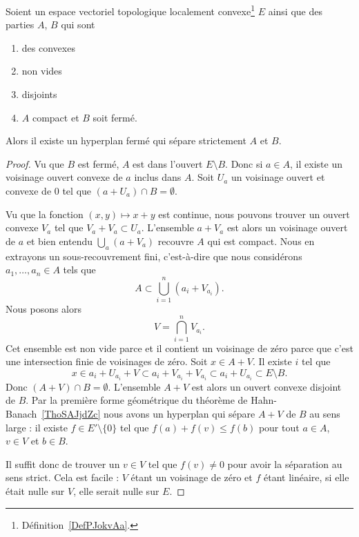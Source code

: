 \begin{theorem} \label{ThoACuKgtW}
    Soient un espace vectoriel topologique localement convexe\footnote{Définition~\ref{DefPJokvAa}.} \( E\) ainsi que des parties \( A\), \( B\) qui sont
    \begin{enumerate}
        \item
              des convexes
        \item
              non vides
        \item
              disjoints
        \item
              \( A\) compact et \( B\) soit fermé.
    \end{enumerate}
    Alors il existe un hyperplan fermé qui sépare strictement \( A\) et \( B\).
\end{theorem}

\begin{proof}
    Vu que \( B\) est fermé, \( A\) est dans l'ouvert \( E\setminus B\). Donc si \( a\in A\), il existe un voisinage ouvert convexe de \( a\) inclus dans \( A\). Soit \( U_a\) un voisinage ouvert et convexe de \( 0\) tel que \( (a+U_a)\cap B=\emptyset\).

    Vu que la fonction \( (x,y)\mapsto x+y\) est continue, nous pouvons trouver un ouvert convexe \( V_a\) tel que \( V_a+V_a\subset U_a\). L'ensemble \( a+V_a\) est alors un voisinage ouvert de \( a\) et bien entendu \( \bigcup_a(a+V_a)\) recouvre \( A\) qui est compact. Nous en extrayons un sous-recouvrement fini, c'est-à-dire que nous considérons \( a_1,\ldots, a_n\in A\) tels que
    \begin{equation}
        A\subset \bigcup_{i=1}^n(a_i+V_{a_i}).
    \end{equation}
    Nous posons alors
    \begin{equation}
        V=\bigcap_{i=1}^nV_{a_i}.
    \end{equation}
    Cet ensemble est non vide parce et il contient un voisinage de zéro parce que c'est une intersection finie de voisinages de zéro. Soit \( x\in A+V\). Il existe \( i\) tel que
    \begin{equation}
        x\in a_i+U_{a_i}+V\subset a_i+V_{a_i}+V_{a_i}\subset a_i+U_{a_i}\subset E\setminus B.
    \end{equation}
    Donc \( (A+V)\cap B=\emptyset\). L'ensemble \( A+V\) est alors un ouvert convexe disjoint de \( B\). Par la première forme géométrique du théorème de Hahn-Banach~\ref{ThoSAJjdZc} nous avons un hyperplan qui sépare \( A+V\) de \( B\) au sens large : il existe \( f\in E'\setminus\{ 0 \}\) tel que \( f(a)+f(v)\leq f(b)\) pour tout \( a\in A\), \( v\in V\) et \( b\in B\).

    Il suffit donc de trouver un \( v\in V\) tel que \( f(v)\neq 0\) pour avoir la séparation au sens strict. Cela est facile : \( V\) étant un voisinage de zéro et \( f\) étant linéaire, si elle était nulle sur \( V\), elle serait nulle sur \( E\).
\end{proof}

